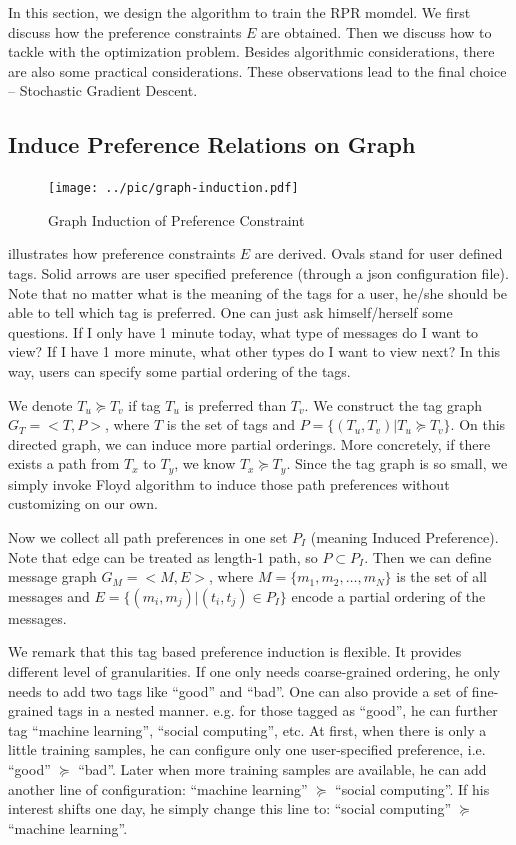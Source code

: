 \documentclass{sig-alternate}
\begin{document}
In this section, we design the algorithm to train the RPR momdel. 
We first discuss how the preference constraints $E$ are obtained. 
Then we discuss how to tackle with the optimization problem. 
Besides algorithmic considerations, 
there are also some practical considerations. 
These observations lead to the final choice -- Stochastic Gradient Descent. 

\subsection{Induce Preference Relations on Graph}
\label{sec:Induce Preference Relations on Graph}

\begin{figure}[t!]
	\centering
	\texttt{[image: ../pic/graph-induction.pdf]}
	\caption{Graph Induction of Preference Constraint}
	\label{fig:graph_induction}
\end{figure}

\rfig{\ref{fig:graph_induction}} illustrates how preference constraints $E$ are derived. 
Ovals stand for user defined tags. 
Solid arrows are user specified preference (through a json configuration file).
Note that no matter what is the meaning of the tags for a user, 
he/she should be able to tell which tag is preferred. 
One can just ask himself/herself some questions. 
If I only have 1 minute today, what type of messages do I want to view?
If I have 1 more minute, what other types do I want to view next? 
In this way, users can specify some partial ordering of the tags.

We denote $T_u \succeq T_v$ if tag $T_u$ is preferred than $T_v$. 
We construct the tag graph $G_T = <T, P>$, 
where $T$ is the set of tags and 
$P = \{(T_u,T_v)| T_u \succeq T_v\}$. 
On this directed graph, we can induce more partial orderings. 
More concretely, if there exists a path from $T_x$ to $T_y$, 
we know $T_x \succeq T_y$. 
Since the tag graph is so small, 
we simply invoke Floyd algorithm \cite{wiki_floyd}
to induce those path preferences without customizing on our own. 

Now we collect all path preferences in one set $P_I$
(meaning Induced Preference). 
Note that edge can be treated as length-1 path, so $P \subset P_I$. 
Then we can define message graph $G_M = <M, E>$, 
where $M = \{m_1, m_2, \ldots, m_N\}$ is the set of all messages
and $E = \{(m_i,m_j)| (t_i, t_j) \in P_I\}$ 
encode a partial ordering of the messages. 

We remark that this tag based preference induction is flexible. 
It provides different level of granularities. 
If one only needs coarse-grained ordering, 
he only needs to add two tags like ``good'' and ``bad''. 
One can also provide a set of fine-grained tags in a nested manner. 
e.g. for those tagged as ``good'', he can further tag 
``machine learning'', ``social computing'', etc. 
At first, when there is only a little training samples, 
he can configure only one user-specified preference, 
i.e. ``good'' $\succeq$ ``bad''.
Later when more training samples are available, 
he can add another line of configuration:
``machine learning'' $\succeq$ ``social computing''. 
If his interest shifts one day, he simply change this line to:
``social computing'' $\succeq$ ``machine learning''. 
\end{document}
